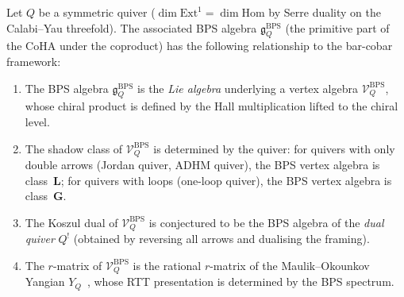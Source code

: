 \begin{proposition}
\label{prop:coha-bar-cobar}
Let $Q$ be a symmetric quiver \textup{(}$\dim \mathrm{Ext}^1 = \dim \mathrm{Hom}$
by Serre duality on the Calabi--Yau threefold\textup{)}.
The associated BPS algebra $\mathfrak{g}_Q^{\mathrm{BPS}}$
\textup{(}the primitive part of the CoHA under the coproduct\textup{)}
has the following relationship to the bar-cobar framework:
\begin{enumerate}[label=\textup{(\roman*)},nosep]
\item The BPS algebra $\mathfrak{g}_Q^{\mathrm{BPS}}$ is the
 \emph{Lie algebra} underlying a vertex algebra
 $\mathcal{V}_Q^{\mathrm{BPS}}$, whose chiral product is
 defined by the Hall multiplication lifted to the chiral level.

\item The shadow class of $\mathcal{V}_Q^{\mathrm{BPS}}$ is
 determined by the quiver: for quivers with only double arrows
 \textup{(}Jordan quiver, ADHM quiver\textup{)}, the BPS vertex
 algebra is class~$\mathbf{L}$; for quivers with loops
 \textup{(}one-loop quiver\textup{)}, the BPS vertex algebra
 is class~$\mathbf{G}$.

\item The Koszul dual of $\mathcal{V}_Q^{\mathrm{BPS}}$ is
 conjectured to be the BPS algebra of the \emph{dual quiver}
 $Q^!$ \textup{(}obtained by reversing all arrows and dualising
 the framing\textup{)}.

\item The $r$-matrix of $\mathcal{V}_Q^{\mathrm{BPS}}$ is the
 rational $r$-matrix of the Maulik--Okounkov Yangian
 $Y_{Q}$~\cite{SV13}, whose RTT presentation is determined by
 the BPS spectrum.
\end{enumerate}
\end{proposition}


